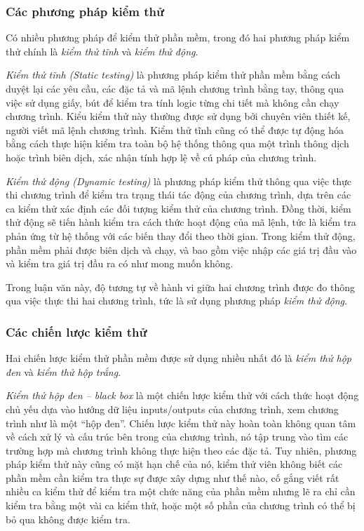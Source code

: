 \subsubsection{Các phương pháp kiểm thử}

Có nhiều phương pháp để kiểm thử phần mềm, trong đó hai phương pháp
kiểm thử chính là \emph{kiểm thử tĩnh} và \emph{kiểm thử động}.

\emph{Kiểm thử tĩnh (Static testing)} là phương pháp kiểm thử phần mềm
bằng cách duyệt lại các yêu cầu, các đặc tả và mã lệnh chương trình
bằng tay, thông qua việc sử dụng giấy, bút để kiểm tra tính logic từng
chi tiết mà không cần chạy chương trình. Kiểu kiểm thử này thường được
sử dụng bởi chuyên viên thiết kế, người viết mã lệnh chương
trình. Kiểm thử tĩnh cũng có thể được tự động hóa bằng cách thực hiện
kiểm tra toàn bộ hệ thống thông qua một trình thông dịch hoặc trình
biên dịch, xác nhận tính hợp lệ về cú pháp của chương trình.
		
\emph{Kiểm thử động (Dynamic testing)} là phương pháp kiểm thử thông
qua việc thực thi chương trình để kiểm tra trạng thái tác động của
chương trình, dựa trên các ca kiểm thử xác định các đối tượng kiểm thử
của chương trình. Đồng thời, kiểm thử động sẽ tiến hành kiểm tra cách
thức hoạt động của mã lệnh, tức là kiểm tra phản ứng từ hệ thống với
các biến thay đổi theo thời gian. Trong kiểm thử động, phần mềm phải
được biên dịch và chạy, và bao gồm việc nhập các giá trị đầu vào và
kiểm tra giá trị đầu ra có như mong muốn không.

Trong luận văn này, độ tương tự về hành vi giữa hai chương trình được
đo thông qua việc thực thi hai chương trình, tức là sử dụng phương
pháp \emph{kiểm thử động}.
	
\subsubsection{Các chiến lược kiểm thử}

Hai chiến lược kiểm thử phần mềm được sử dụng nhiều nhất đó là \emph{kiểm thử hộp đen} và \emph{kiểm thử hộp trắng}.
	
\emph{Kiểm thử hộp đen – black box} là một chiến lược kiểm thử với
cách thức hoạt động chủ yếu dựa vào hướng dữ liệu inputs/outputs của
chương trình, xem chương trình như là một ``hộp đen''. Chiến lược kiểm
thử này hoàn toàn không quan tâm về cách xử lý và cấu trúc bên trong
của chương trình, nó tập trung vào tìm các trường hợp mà chương trình
không thực hiện theo các đặc tả. Tuy nhiên, phương pháp kiểm thử này
cũng có mặt hạn chế của nó, kiểm thử viên không biết các phần mềm cần
kiểm tra thực sự được xây dựng như thế nào, cố gắng viết rất nhiều ca
kiểm thử để kiểm tra một chức năng của phần mềm nhưng lẽ ra chỉ cần
kiểm tra bằng một vài ca kiểm thử, hoặc một số phần của chương trình
có thể bị bỏ qua không được kiểm tra.

